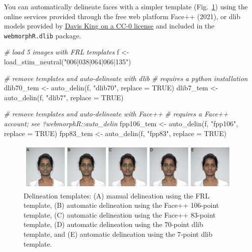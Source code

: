 \documentclass[
  man,floatsintext]{apa6}
\newenvironment{Shaded}{\begin{snugshade}}{\end{snugshade}}
\newcommand{\AttributeTok}[1]{\textcolor[rgb]{0.77,0.63,0.00}{#1}}
\newcommand{\CommentTok}[1]{\textcolor[rgb]{0.56,0.35,0.01}{\textit{#1}}}
\newcommand{\ConstantTok}[1]{\textcolor[rgb]{0.00,0.00,0.00}{#1}}
\newcommand{\FunctionTok}[1]{\textcolor[rgb]{0.00,0.00,0.00}{#1}}
\newcommand{\NormalTok}[1]{#1}
\newcommand{\OtherTok}[1]{\textcolor[rgb]{0.56,0.35,0.01}{#1}}
\newcommand{\StringTok}[1]{\textcolor[rgb]{0.31,0.60,0.02}{#1}}
\begin{document}
You can automatically delineate faces with a simpler template (Fig.~\ref{fig:auto-delin}) using the online services provided through the free web platform Face++ (2021), or dlib models provided by \href{https://github.com/davisking/dlib-models}{Davis King on a CC-0 license} and included in the \texttt{webmorphR.dlib} package.

\begin{Shaded}
\begin{Highlighting}[]
\CommentTok{\# load 5 images with FRL templates}
\NormalTok{f }\OtherTok{\textless{}{-}} \FunctionTok{load\_stim\_neutral}\NormalTok{(}\StringTok{"006|038|064|066|135"}\NormalTok{)}

\CommentTok{\# remove templates and auto{-}delineate with dlib}
\CommentTok{\# requires a python installation}
\NormalTok{dlib70\_tem }\OtherTok{\textless{}{-}} \FunctionTok{auto\_delin}\NormalTok{(f, }\StringTok{"dlib70"}\NormalTok{, }\AttributeTok{replace =} \ConstantTok{TRUE}\NormalTok{)}
\NormalTok{dlib7\_tem }\OtherTok{\textless{}{-}} \FunctionTok{auto\_delin}\NormalTok{(f, }\StringTok{"dlib7"}\NormalTok{, }\AttributeTok{replace =} \ConstantTok{TRUE}\NormalTok{)}

\CommentTok{\# remove templates and auto{-}delineate with Face++}
\CommentTok{\# requires a Face++ account; see ?webmorphR::auto\_delin}
\NormalTok{fpp106\_tem }\OtherTok{\textless{}{-}} \FunctionTok{auto\_delin}\NormalTok{(f, }\StringTok{"fpp106"}\NormalTok{, }\AttributeTok{replace =} \ConstantTok{TRUE}\NormalTok{)}
\NormalTok{fpp83\_tem }\OtherTok{\textless{}{-}} \FunctionTok{auto\_delin}\NormalTok{(f, }\StringTok{"fpp83"}\NormalTok{, }\AttributeTok{replace =} \ConstantTok{TRUE}\NormalTok{)}
\end{Highlighting}
\end{Shaded}

\begin{figure}
\includegraphics[width=1\linewidth]{index_files/figure-latex/auto-delin-1} \caption{Delineation templates: (A) manual delineation using the FRL template, (B) automatic delineation using the Face++ 106-point template, (C) automatic delineation using the Face++ 83-point template, (D) automatic delineation using the 70-point dlib template, and (E) automatic delineation using the 7-point dlib template.}\label{fig:auto-delin}
\end{figure}
\end{document}
